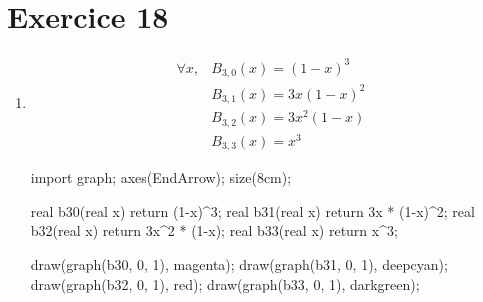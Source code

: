 \part{Exercice 18}

\begin{enumerate}
	\item
		\begin{align*}
			\forall x, &B_{3,0}(x) = (1-x)^3\\
			&B_{3,1}(x) = 3x(1-x)^2\\
			&B_{3,2}(x) = 3x^2(1-x)\\
			&B_{3,3}(x) = x^3
		\end{align*}

		\begin{center}
			\begin{asy}
				import graph;
				axes(EndArrow);
				size(8cm);

				real b30(real x) { return (1-x)^3; }
				real b31(real x) { return 3x * (1-x)^2; }
				real b32(real x) { return 3x^2 * (1-x); }
				real b33(real x) { return x^3; }

				draw(graph(b30, 0, 1), magenta);
				draw(graph(b31, 0, 1), deepcyan);
				draw(graph(b32, 0, 1), red);
				draw(graph(b33, 0, 1), darkgreen);


\end{asy}
\end{center}
\end{enumerate}
